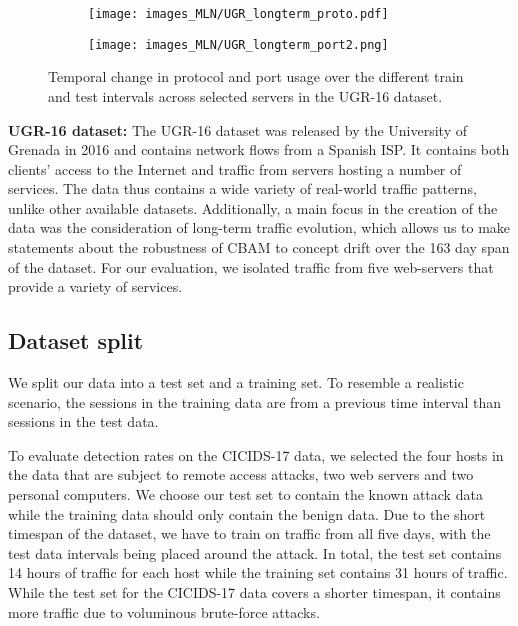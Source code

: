 \begin{figure}[ht]
\centering
\vspace{-0.2cm}
    \begin{subfigure}[b]{0.45\textwidth}
        \texttt{[image: images\_MLN/UGR\_longterm\_proto.pdf]}
        \vspace{-0.4cm}
    \end{subfigure}
    \begin{subfigure}[b]{0.45\textwidth}
        \texttt{[image: images\_MLN/UGR\_longterm\_port2.png]}
    \end{subfigure}
\caption{Temporal change in protocol and port usage over the different train and test intervals across selected servers in the UGR-16 dataset.}
\label{figF:longterm_analysis}
\end{figure}

\textbf{UGR-16 dataset:}
The UGR-16 dataset \cite{macia2018ugr} was released by the University of Grenada in 2016 and contains network flows from a Spanish ISP. It contains both clients' access to the Internet and traffic from servers hosting a number of services. The data thus contains a wide variety of real-world traffic patterns, unlike other available datasets. %
Additionally, a main focus in the creation of the data was the consideration of long-term traffic evolution, which allows us to make statements about the robustness of CBAM to concept drift over the 163 day span of the dataset. For our evaluation, we isolated traffic from five web-servers that provide a variety of services.



\subsection{Dataset split}

We split our data into a test set and a training set. To resemble a realistic scenario, the sessions in the training data are from a previous time interval than sessions in the test data. 

To evaluate detection rates on the CICIDS-17 data, we selected the four hosts in the data that are subject to remote access attacks, two web servers and two personal computers. 
We choose our test set to contain the known attack data while the training data should only contain the benign data. Due to the short timespan of the dataset, we have to train on traffic from all five days, with the test data intervals being placed around the attack. 
In total, the test set contains 14 hours of traffic for each host while the training set contains 31 hours of traffic. While the test set for the CICIDS-17 data covers a shorter timespan, it contains more traffic due to voluminous brute-force attacks.

